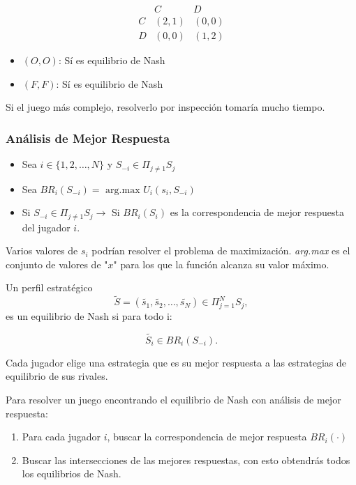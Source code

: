 \documentclass[letterpaper,12pt,twocolumn]{report}
\begin{document}
$$
\begin{matrix}
	&  C & D \\
	C & (2,1) & (0,0)  \\
	D & (0,0) & (1,2) 
	
\end{matrix}
$$

\begin{itemize}
	\item $(O,O)$: Sí es equilibrio de Nash

	\item $(F,F)$: Sí es equilibrio de Nash
\end{itemize}


Si el juego más complejo, resolverlo por inspección tomaría mucho tiempo.

\subsubsection*{Análisis de Mejor Respuesta}

\begin{itemize}
	\item Sea $i \in \{1,2,\dots , N \}$ y $S_{-i} \in \Pi_{j\neq1} S_j$
	\item Sea $BR_i(S_{-i})=\text{ arg.max } U_i(s_i,S_{-i})$
	\item Si $S_{-i} \in \Pi_{j\neq1} S_j \rightarrow \text{ Si }BR_i(S_i)$ es la correspondencia de mejor respuesta del jugador $i$.
\end{itemize}

\begin{tcolorbox}[title= Nota]
	
Varios valores de $s_i$ podrían resolver el problema de maximización. \textit{arg.max} es el conjunto de valores de "$x$" para los que la función alcanza su valor máximo.

Un perfil estratégico $$\widetilde{S}=(\widetilde{s_1},\widetilde{s_2},\dots, \widetilde{s_N})\in \Pi_{j=1}^N S_j,$$ es un equilibrio de Nash si para todo i: 

$$ \widetilde{S_i}\in BR_i(S_{-i}). $$

\end{tcolorbox}


Cada jugador elige una estrategia que es su mejor respuesta a las estrategias de equilibrio de sus rivales.

Para resolver un juego encontrando el equilibrio de Nash con análisis de mejor respuesta:

\begin{enumerate}
	\item Para cada jugador $i$, buscar la correspondencia de mejor respuesta $BR_i(\cdot)$
	\item Buscar las intersecciones de las mejores respuestas, con esto obtendrás todos los equilibrios de Nash.
\end{enumerate}
\end{document}
